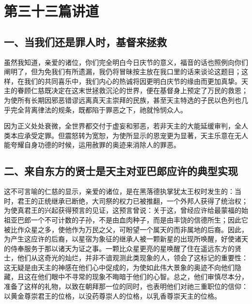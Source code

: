 

\section{第三十三篇讲道}

\par


\subsection{一、当我们还是罪人时，基督来拯救}

虽然我知道，亲爱的诸位，你们完全明白今日庆节的意义，福音的话也照例向你们阐明了，但为免我们有所遗漏，我仍将冒昧按主放在我口里的话来谈论这题目；这样，在我们的共同喜乐中，我们内心的热诚将因更明白庆节的缘由而更加真挚。天主的眷顾仁慈既决定在这末世拯救沉沦的世界，便在基督身上预定了万民的救恩；为使所有长期因邪恶错谬远离真天主崇拜的民族，甚至天主特选的子民以色列也几乎完全背离律法的规条，既都陷于罪恶之下，祂就怜悯众人。\par

因为正义处处衰微，全世界都交付于虚妄和邪恶，若非天主的大能延缓审判，全人类本应承受定罪。但震怒转为宽恕，为使所显示的恩宠更为显著，天主乐意在无人能夸耀自身功德的时候，运用赦罪的奥迹来消除人的罪恶。\par


\subsection{二、来自东方的贤士是天主对亚巴郎应许的典型实现}

这不可言喻的仁慈的显示，亲爱的诸位，是在黑落德执掌犹太王权时发生的：当时，君王的正统继承已断绝，大司祭的权力已被推翻，一个外邦人获得了统治权；为使真君王的兴起获得预言的见证，这预言曾说：关于这，曾经应许给最蒙福的始祖亚巴郎一个不可计数的子孙，不是由血肉种子，而是由丰饶的信德所生；因此它被比作众星之多，使他作为万民之父，可盼望一个属天的而非属地的后裔。因此，为产生这应许的后裔，以星宿为象征的继承人被一颗新星的出现所唤醒，好使诸天的侍奉服务于那以诸天为证之事。一颗比众星更亮的星唤醒了住在遥远东方的贤士，他们从这奇光的灿烂，并非不谙观测此类现象的人，领会了这标记的重要性：这无疑是由天主的神感在他们心中促成的，为使如此伟大景象的奥迹不向他们隐藏，且这在他们眼中不寻常的现象不晦暗于他们的心智。总之，他们审慎尽本分，准备了这样的礼物，以致在朝拜那一位的同时，也表明他们对祂三重职位的信仰：以黄金尊崇君王的位格，以没药尊崇人的位格，以乳香尊崇天主的位格。\par

